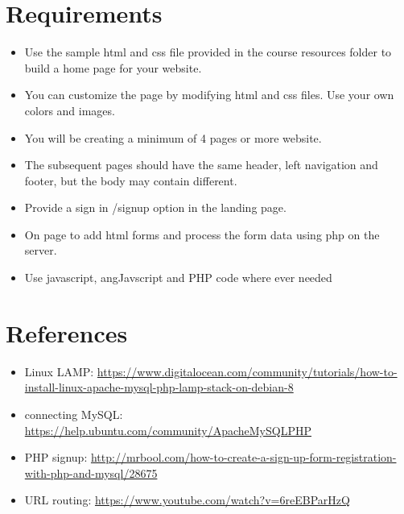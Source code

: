 \documentclass[9pt,b5paper]{article}
\begin{document}
\section{Requirements}
\label{sec-4}
\begin{itemize}
\item Use the  sample html and css file provided in the course resources folder to build a home page for your website.
\item You can customize the page by modifying html and css files. Use your own colors and images.
\item You will be creating a minimum of 4 pages or more website.
\item The subsequent pages should have the same header, left navigation and footer, but the body may contain different.
\item Provide a sign in /signup option in the landing page.
\item On page to add html forms and process the form data using php on the server.
\item Use javascript, angJavscript and PHP code where ever needed
\end{itemize}

\section{References}
\label{sec-5}
\begin{itemize}
\item Linux LAMP: \url{https://www.digitalocean.com/community/tutorials/how-to-install-linux-apache-mysql-php-lamp-stack-on-debian-8}
\item connecting MySQL: \url{https://help.ubuntu.com/community/ApacheMySQLPHP}
\item PHP signup: \url{http://mrbool.com/how-to-create-a-sign-up-form-registration-with-php-and-mysql/28675}
\item URL routing: \url{https://www.youtube.com/watch?v=6reEBParHzQ}
\end{itemize}
\end{document}
